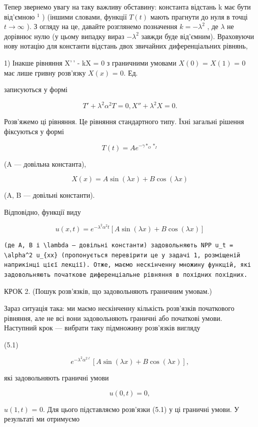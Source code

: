 \documentclass[
  ukrainian,
]{article}
\begin{document}
Тепер звернемо увагу на таку важливу обставину: константа відстань k має
бути від'ємною \(^1\) ) (іншими словами, функції \(T(t)\) мають прагнути
до нуля в точці \(t \to \infty\) ). З огляду на це, давайте розглянемо
позначення \(k = -\lambda^2\) , де \(\lambda\) не дорівнює нулю (у цьому
випадку вираз \(-\lambda^2\) завжди буде від'ємним). Враховуючи нову
нотацію для константи відстань двох звичайних диференціальних рівнянь,

1) Інакше рівняння X'\,' - kX = 0 з граничними умовами \(X(0)\) =
\(X(1)\) = 0 має лише гривну розв'язку \(X(x)\) = 0. Ед.

записуються у формі

\[
T' + \lambda^2 \alpha^2 T = 0,
X'' + \lambda^2 X = 0.
\]

Розв'яжемо ці рівняння. Це рівняння стандартного типу. Їхні загальні
рішення фіксуються у формі

\[
T(t) = Ae^{-\gamma *_{O} *_{I}}
\]

(A --- довільна константа),

\[
X(x) = A \sin(\lambda x) + B \cos(\lambda x)
\]

(A, B --- довільні константи).

Відповідно, функції виду

\[
u(x, t) = e^{-\lambda^2 \alpha^2 t} [A \sin(\lambda x) + B \cos(\lambda x)]
\]

\begin{verbatim}
(де A, B і \lambda — довільні константи) задовольняють NPP u_t = \alpha^2 u_{xx} (пропонується перевірити це у задачі 1, розміщеній наприкінці цієї лекції). Отже, маємо нескінченну множину функцій, які задовольняють початкове диференціальне рівняння в похідних похідних.
\end{verbatim}

КРОК 2. (Пошук розв'язків, що задовольняють граничним умовам.)

Зараз ситуація така: ми маємо нескінченну кількість розв'язків
початкового рівняння, але не всі вони задовольняють граничні або
початкові умови. Наступний крок --- вибрати таку підмножину розв'язків
вигляду

(5.1)

\[
e^{-\lambda^2 \alpha^{2\ell}} [A \sin(\lambda x) + B \cos(\lambda x)],
\]

які задовольняють граничні умови

\[
u(0, t) = 0,
\]

\(u(1, t)\) = 0. Для цього підставляємо розв'язки (5.1) у ці граничні
умови. У результаті ми отримуємо
\end{document}
